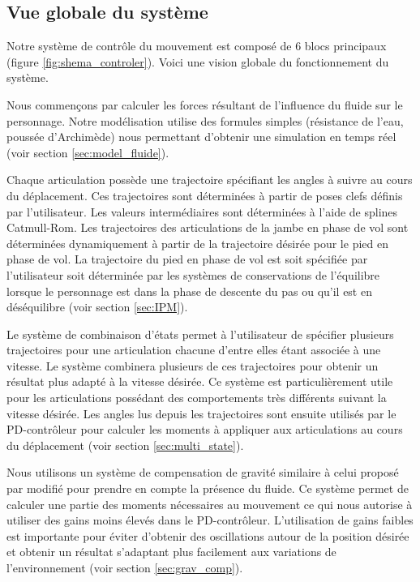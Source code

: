 \documentclass[runningheads,a4paper]{llncs}
\begin{document}
\vspace*{-0.75cm}
\subsection{Vue globale du système}
%


Notre système de contrôle du mouvement est composé de 6 blocs principaux (figure \ref{fig:shema_controler}). Voici une vision globale du fonctionnement du système. 

Nous commençons par calculer les forces résultant de l'influence du fluide sur le personnage. Notre modélisation utilise des formules simples (résistance de l'eau, poussée d'Archimède) nous permettant d'obtenir une simulation en temps réel (voir section \ref{sec:model_fluide}).

Chaque articulation possède une trajectoire spécifiant les angles à suivre au cours du déplacement. Ces trajectoires sont déterminées à partir de poses clefs définis par l'utilisateur. Les valeurs intermédiaires sont déterminées à l'aide de splines Catmull-Rom. Les trajectoires des articulations de la jambe en phase de vol sont déterminées dynamiquement à partir de la trajectoire désirée pour le pied en phase de vol. La trajectoire du pied en phase de vol est soit spécifiée par l'utilisateur soit déterminée par les systèmes de conservations de l'équilibre lorsque le personnage est dans la phase de descente du pas ou qu'il est en déséquilibre (voir section \ref{sec:IPM}).

Le système de combinaison d'états permet à l'utilisateur de spécifier plusieurs trajectoires pour une articulation chacune d'entre elles étant associée à une vitesse. Le système combinera plusieurs de ces trajectoires pour obtenir un résultat plus adapté à la vitesse désirée. Ce système est particulièrement utile pour les articulations possédant des comportements très différents suivant la vitesse désirée. Les angles lus depuis les trajectoires sont ensuite utilisés par le PD-contrôleur pour calculer les moments à appliquer aux articulations au cours du déplacement (voir section \ref{sec:multi_state}).

Nous utilisons un système de compensation de gravité similaire à celui proposé par \cite{coros2010generalized} modifié pour prendre en compte la présence du fluide. Ce système permet de calculer une partie des moments nécessaires au mouvement ce qui nous autorise à utiliser des gains moins élevés dans le PD-contrôleur. L'utilisation de gains faibles est importante pour éviter d'obtenir des oscillations autour de la position désirée et obtenir un résultat s'adaptant plus facilement aux variations de l'environnement (voir section \ref{sec:grav_comp}).
\end{document}
